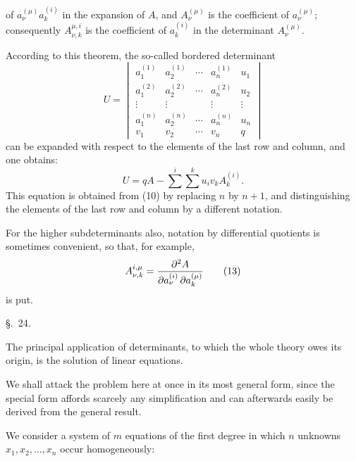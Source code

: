 
of \(a_\nu^{(\mu)}a_k^{(i)}\) in the expansion of \(A\), and \(A_\nu^{(\mu)}\) is the coefficient of \(a_\nu^{(\mu)}\); consequently \(A_{\nu,k}^{\mu,i}\) is the coefficient of \(a_k^{(i)}\) in the determinant \(A_\nu^{(\mu)}\).

According to this theorem, the so-called bordered determinant
\begin{equation}
        U=\begin{vmatrix}
        a_1^{(1)}&a_2^{(1)}&\cdots&a_n^{(1)}&u_1\\
        a_1^{(2)}&a_2^{(2)}&\cdots&a_n^{(2)}&u_2\\
        \vdots&\vdots&&\vdots&\vdots\\
        a_1^{(n)}&a_2^{(n)}&\cdots&a_n^{(n)}&u_n\\
        v_1&v_2&\cdots&v_n&q
        \end{vmatrix}
\tag{11}
\end{equation}
can be expanded with respect to the elements of the last row and column, and one obtains:
\begin{equation}
        U=qA-\sum^{i}\sum^{k}u_i v_k A_k^{(i)}.
\tag{12}
\end{equation}
This equation is obtained from (10) by replacing \(n\) by \(n+1\), and distinguishing the elements of the last row and column by a different notation.

For the higher subdeterminants also, notation by differential quotients is sometimes convenient, so that, for example,
\begin{equation}
        A_{\nu,k}^{i,\mu}=
        {\partial^2 A\over \partial a_\nu^{(i)}\,\partial a_k^{(\mu)}}
\tag{13}
\end{equation}
is put.

\begin{center}
{\large \S.\ 24.}

\vspace{0.5em}
{\large{}}
\end{center}

The principal application of determinants, to which the whole theory owes its origin, is the solution of linear equations.

We shall attack the problem here at once in its most general form, since the special form affords scarcely any simplification and can afterwards easily be derived from the general result.

We consider a system of \(m\) equations of the first degree in which \(n\) unknowns \(x_1,x_2,\ldots,x_n\) occur homogeneously:
